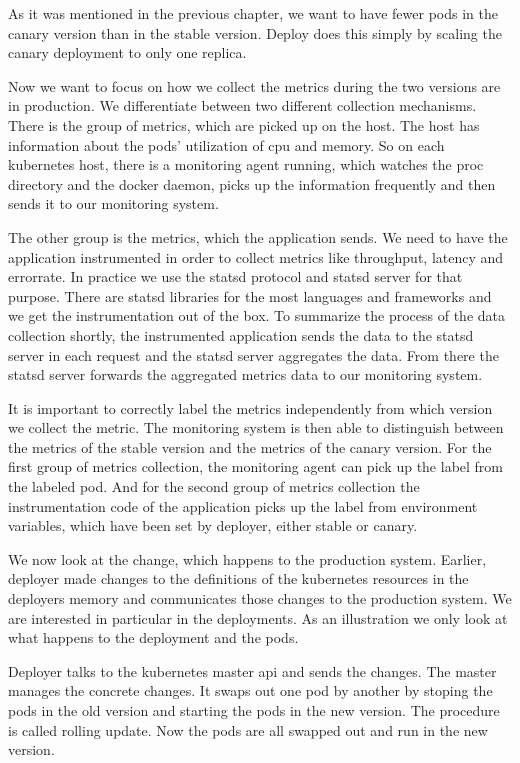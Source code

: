 As it was mentioned in the previous chapter, we want to have fewer pods in the canary
version than in the stable version. Deploy does this simply by scaling the canary
deployment to only one replica.

Now we want to focus on how we collect the metrics during the two versions are in
production. We differentiate between two different collection mechanisms. There is the
group of metrics, which are picked up on the host. The host has information about the
pods' utilization of cpu and memory. So on each kubernetes host, there is a monitoring
agent running, which watches the proc directory and the docker daemon, picks up the
information frequently and then sends it to our monitoring system.

The other group is the metrics, which the application sends. We need to have the
application instrumented in order to collect metrics like throughput, latency and
errorrate. In practice we use the statsd protocol and statsd server for that
purpose. There are statsd libraries for the most languages and frameworks and we get the
instrumentation out of the box. To summarize the process of the data collection shortly,
the instrumented application sends the data to the statsd server in each request and the
statsd server aggregates the data. From there the statsd server forwards the aggregated
metrics data to our monitoring system.

It is important to correctly label the metrics independently from which version we collect
the metric. The monitoring system is then able to distinguish between the metrics of the
stable version and the metrics of the canary version. For the first group of metrics
collection, the monitoring agent can pick up the label from the labeled pod. And for the
second group of metrics collection the instrumentation code of the application picks up
the label from environment variables, which have been set by deployer, either stable or
canary.

We now look at the change, which happens to the production system. Earlier, deployer made
changes to the definitions of the kubernetes resources in the deployers memory and
communicates those changes to the production system. We are interested in particular in
the deployments. As an illustration we only look at what happens to the deployment and the
pods.

Deployer talks to the kubernetes master api and sends the changes. The master manages the
concrete changes. It swaps out one pod by another by stoping the pods in the old version
and starting the pods in the new version. The procedure is called rolling update. Now the
pods are all swapped out and run in the new version.

